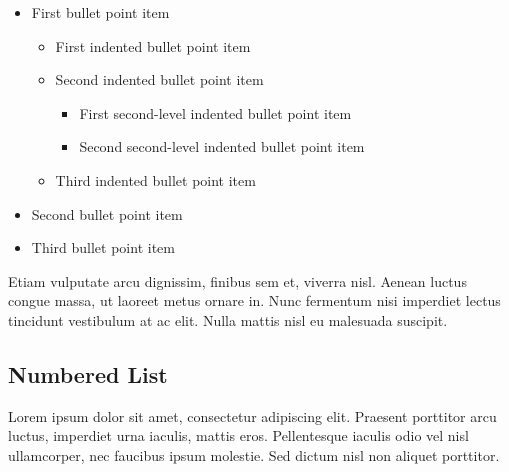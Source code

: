 \documentclass[
	letterpaper, %
	12pt, %
]{CSSullivanBusinessReport}
\begin{document}
\begin{itemize}
	\item First bullet point item
	\begin{itemize}
		\item First indented bullet point item
		\item Second indented bullet point item
		\begin{itemize}
			\item First second-level indented bullet point item
			\item Second second-level indented bullet point item
		\end{itemize}
		\item Third indented bullet point item
	\end{itemize}
	\item Second bullet point item
	\item Third bullet point item
\end{itemize}

Etiam vulputate arcu dignissim, finibus sem et, viverra nisl. Aenean luctus congue massa, ut laoreet metus ornare in. Nunc fermentum nisi imperdiet lectus tincidunt vestibulum at ac elit. Nulla mattis nisl eu malesuada suscipit.


\subsection{Numbered List}

Lorem ipsum dolor sit amet, consectetur adipiscing elit. Praesent porttitor arcu luctus, imperdiet urna iaculis, mattis eros. Pellentesque iaculis odio vel nisl ullamcorper, nec faucibus ipsum molestie. Sed dictum nisl non aliquet porttitor.
\end{document}
